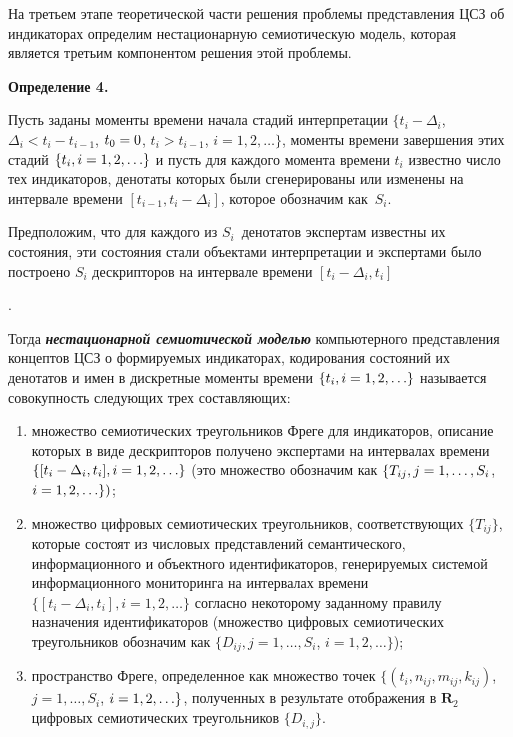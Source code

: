 \begin{multicols}{2}
   На третьем этапе теоретической части решения проблемы представления ЦСЗ об 
индикаторах определим нестационарную семиотическую \mbox{модель}, которая является третьим 
компонентом решения этой проблемы.
   
\smallskip
   
   \noindent
   \textbf{Определение 4.} {Пусть заданы моменты времени начала стадий 
интерпретации $\{t_i -\Delta_i$, $\Delta_i < t_i - t_{i-1}$, $t_0 \hm= 0$, 
$t_i > t_{i-1}$, $i = 1, 2, \ldots \}$, 
моменты времени завершения этих стадий $\{t_i, i \hm =1, 2, \ldots\}$ и пусть для каждого 
момента времени $t_i$ известно число тех индикаторов, денотаты которых были 
сгенерированы или изменены на интервале времени $[t_{i-1}, t_i -\Delta_i]$, которое 
обозначим как~$S_i$. 

Предположим, что для каждого из $S_i$~денотатов экспертам известны 
их состояния, эти состояния стали объектами интерпретации и экспертами было построено $S_i$ 
дескрипторов на интервале времени $[t_i - \Delta_i, t_i]$}.
   
Тогда {\bfseries\textit{нестационарной семиотической моделью}} компьютерного представления 
концептов ЦСЗ о формируемых индикаторах, кодирования состояний их денотатов и имен в 
дискретные моменты времени $\{t_i, i \hm= 1, 2,  \ldots\}$ называется совокупность 
следующих трех составляющих:
   \begin{enumerate}[(1)]
\item {множество семиотических треугольников Фреге для индикаторов, описание которых 
в виде дескрипторов получено экспертами на интервалах времени $\{[t_i -\Delta_i, t_i], i 
\hm =1, 2, \ldots\}$ (это множество обозначим как $\{T_{ij}, j\hm=1, \ldots , S_i$, $i \hm= 1, 2, 
\ldots\})$};
\item {множество цифровых семиотических треугольников, соответствующих $\{T_{ij}\}$, 
которые состоят из числовых представлений семантического, информационного и 
объектного идентификаторов, генерируемых системой информационного мониторинга на 
интервалах времени $\{[t_i -\Delta_i, t_i], i = 1, 2, \ldots\}$ согласно некоторому заданному 
правилу назначения идентификаторов (множество цифровых семиотических 
треугольников обозначим как $\{D_{ij}, j = 1, \ldots, S_i$, $i = 1, 2, \ldots\}$)};
\item пространство Фреге, определенное как множество точек 
$\{(t_i, n_{ij}, m_{ij}, k_{ij})$, 
$j=1, \ldots , S_i$, $i \hm= 1, 2, \ldots\}$, полученных в результате отображения в 
$\mathbf{R}_2$ цифровых семиотических треугольников $\{D_{i,j}\}$.
\end{enumerate}



\end{multicols}
